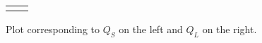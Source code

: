 \begin{figure}[H]
\begin{tabular}{cc}
%
%

&

\end{tabular}
\caption{Plot corresponding to $Q_S$ on the left and $Q_L$ on the right.}
\label{polplot}
\end{figure}
